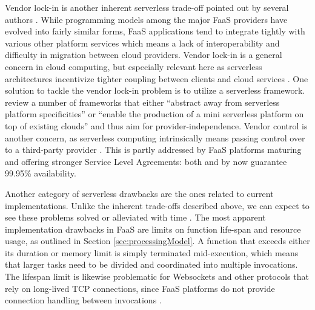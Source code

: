 Vendor lock-in is another inherent serverless trade-off pointed out by several authors \parencite[e.g.][]{baldini17currentTrends,cncf18serverlessWG,robert2016serverlessarchitectures}. While programming models among the major FaaS providers have evolved into fairly similar forms, FaaS applications tend to integrate tightly with various other platform services which means a lack of interoperability and difficulty in migration between cloud providers. Vendor lock-in is a general concern in cloud computing, but especially relevant here as serverless architectures incentivize tighter coupling between clients and cloud services \parencite{adzic2017serverless}. One solution to tackle the vendor lock-in problem is to utilize a serverless framework. \textcite{kritikos18frameworks} review a number of frameworks that either ``abstract away from serverless platform specificities'' or ``enable the production of a mini serverless platform on top of existing clouds'' and thus aim for provider-independence. Vendor control is another concern, as serverless computing intrinsically means passing control over to a third-party provider \parencite{robert2016serverlessarchitectures}. This is partly addressed by FaaS platforms maturing and offering stronger Service Level Agreements: both \textcite{awslambda0218} and \textcite{microsoft18azureFunctions} by now guarantee 99.95\% availability.

Another category of serverless drawbacks are the ones related to current implementations. Unlike the inherent trade-offs described above, we can expect to see these problems solved or alleviated with time \parencite{robert2016serverlessarchitectures}. The most apparent implementation drawbacks in FaaS are limits on function life-span and resource usage, as outlined in Section \ref{sec:processingModel}. A function that exceeds either its duration or memory limit is simply terminated mid-execution, which means that larger tasks need to be divided and coordinated into multiple invocations. The lifespan limit is likewise problematic for Websockets and other protocols that rely on long-lived TCP connections, since FaaS platforms do not provide connection handling between invocations \parencite{hendrickson16openlambda}.

